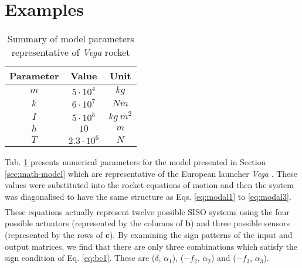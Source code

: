 \documentclass{mbd_fullpaper}
\begin{document}
\section{Examples}
\label{sec:num-examples}
\begin{table}[!ht]
  \begin{center}
    \caption{Summary of model parameters representative of \emph{Vega} rocket \label{tab:modelparam}}
    \vspace{1mm}
    \begin{tabular}{ ccc }
	\hline
           Parameter & Value & Unit \\
	\hline
      	$m$ & $5 \cdot 10^4$ & $kg$\\
      	$k$ & $6 \cdot 10^7$ & $Nm$\\
      	$I$ & $5 \cdot 10^5$ & $kg~m^2$\\
      	$h$ & $10$ & $m$\\
      	$T$ & $2.3 \cdot 10^6$ & $N$\\
    \end{tabular}
  \end{center}
\end{table}
Tab. \ref{tab:modelparam} presents numerical parameters for the model presented in Section \ref{sec:math-model} which are representative of the European launcher \emph{Vega} \cite{Perez2006}.
These values were substituted into the rocket equations of motion and then the system was diagonalised to have the same structure as Eqs. \ref{eq:modal1} to \ref{eq:modal3}.
%
\begin{multline}

\label{eq:num_rock1}
\end{multline}
\begin{equation}

\label{eq:num_rock2}
\end{equation}
%
These equations actually represent twelve possible SISO systems using the four possible actuators (represented by the columns of $\mathbf{b}$) and three possible sensors (represented by the rows of $\mathbf{c}$).
By examining the sign patterns of the input and output matrices, we find that there are only three combinations which satisfy the sign condition of Eq. \ref{eq:bc1}.
These are ($\delta$, $\alpha_1$), ($-f_2$, $\alpha_2$) and ($-f_3$, $\alpha_3$).
\end{document}

